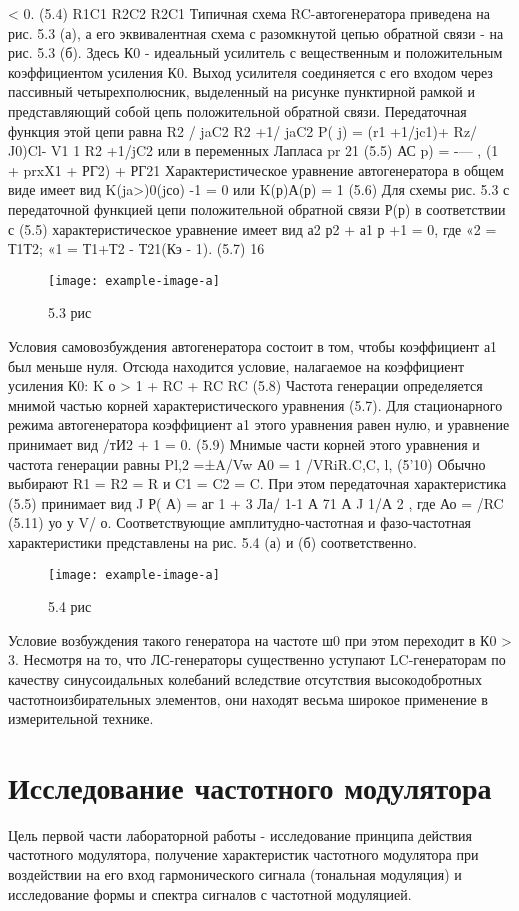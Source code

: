 ﻿\documentclass[a4paper,12pt]{article}
\begin{document}
< 0.
(5.4)
R1C1 R2C2 R2C1
Типичная схема RC-автогенератора приведена на рис. 5.3 (а), а его эквивалентная схема с разомкнутой цепью обратной связи - на рис. 5.3 (б). Здесь К0 - идеальный усилитель с вещественным и положительным коэффициентом усиления К0. Выход усилителя соединяется с его входом через пассивный четырехполюсник, выделенный на рисунке пунктирной рамкой и представляющий собой цепь положительной обратной связи. Передаточная функция этой цепи равна
R2 / jaC2 R2 +1/ jaC2
P( j) =
(r1 +1/jc1)+ Rz/ J0)Cl-
V1	1 R2 +1/jC2
или в переменных Лапласа
pr
21
(5.5)
АС p) = -—	,
(1 + prxX1 + РГ2) + РГ21 Характеристическое уравнение автогенератора в общем виде имеет вид
K(ja>)0(jсо) -1 = 0 или K(р)А(р) = 1	(5.6)
Для схемы рис. 5.3 с передаточной функцией цепи положительной обратной связи Р(р) в соответствии с (5.5) характеристическое уравнение имеет вид
а2 р2 + а1 р +1 = 0, где «2 = Т1Т2; «1 = Т1+Т2 - Т21(Кэ - 1).
(5.7)
16
\begin{figure}[H]
	\centering
	\texttt{[image: example-image-a]}
	\caption{5.3 рис}
\end{figure}
Условия самовозбуждения автогенератора состоит в том, чтобы коэффициент а1 был меньше нуля. Отсюда находится условие, налагаемое на коэффициент усиления К0:
K о > 1 +
RC + RC RC
(5.8)
Частота генерации определяется мнимой частью корней характеристического уравнения (5.7). Для стационарного режима автогенератора коэффициент а1 этого уравнения равен нулю, и уравнение принимает вид
/тИ2 + 1 = 0.	(5.9)
Мнимые части корней этого уравнения и частота генерации равны
Pl,2 =±A/Vw А0 = 1
/VRiR.C,C, l,	(5'10)
Обычно выбирают R1 = R2 = R и C1 = C2 = C. При этом передаточная характеристика (5.5) принимает вид
J
Р( А) =
аг
1 + 3 Ла/ 1-1 А 71 А J 1/А
2 , где Ао = /RC 
(5.11)
уо у V/ о.
Соответствующие амплитудно-частотная и фазо-частотная характеристики представлены на рис. 5.4 (а) и (б) соответственно.
\begin{figure}[H]
	\centering
	\texttt{[image: example-image-a]}
	\caption{5.4 рис}
\end{figure}
Условие возбуждения такого генератора на частоте ш0 при этом переходит в К0 > 3. Несмотря на то, что ЛС-генераторы существенно уступают LC-генераторам по качеству синусоидальных колебаний вследствие отсутствия высокодобротных частотноизбирательных элементов, они находят весьма широкое применение в измерительной технике.

\section{Исследование частотного модулятора}
Цель первой части лабораторной работы - исследование принципа действия частотного модулятора, получение характеристик частотного модулятора при воздействии на его вход гармонического сигнала (тональная модуляция) и исследование формы и спектра сигналов с частотной модуляцией.
\end{document}
